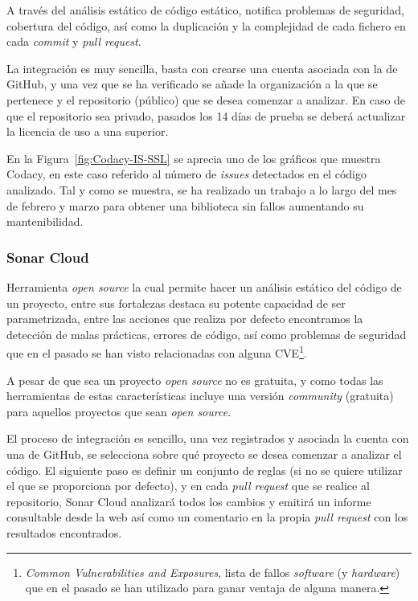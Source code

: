 A través del análisis estático de código estático, notifica problemas de seguridad, cobertura del código, así como la duplicación y la complejidad de cada fichero en cada \textit{commit} y \textit{pull request}.

La integración es muy sencilla, basta con crearse una cuenta asociada con la de GitHub, y una vez que se ha verificado se añade la organización a la que se pertenece y el repositorio (público) que se desea comenzar a analizar. En caso de que el repositorio sea privado, pasados los 14 días de prueba se deberá actualizar la licencia de uso a una superior.


En la Figura~\ref{fig:Codacy-IS-SSL} se aprecia uno de los gráficos que muestra Codacy, en este caso referido al número de \textit{issues} detectados en el código analizado. Tal y como se muestra, se ha realizado un trabajo a lo largo del mes de febrero y marzo para obtener una biblioteca sin fallos aumentando su mantenibilidad.

\subsubsection{Sonar Cloud}

Herramienta \textit{open source} la cual permite hacer un análisis estático del código de un proyecto, entre sus fortalezas destaca su potente capacidad de ser parametrizada, entre las acciones que realiza por defecto encontramos la detección de malas prácticas, errores de código, así como problemas de seguridad que en el pasado se han visto relacionadas con alguna CVE\footnote{\textit{Common Vulnerabilities and Exposures}, lista de fallos \textit{software} (y \textit{hardware}) que en el pasado se han utilizado para ganar ventaja de alguna manera.}.

A pesar de que sea un proyecto \textit{open source} no es gratuita, y como todas las herramientas de estas características incluye una versión \textit{community} (gratuita) para aquellos proyectos que sean \textit{open source}.

El proceso de integración es sencillo, una vez registrados y asociada la cuenta con una de GitHub, se selecciona sobre qué proyecto se desea comenzar a analizar el código. El siguiente paso es definir un conjunto de reglas (si no se quiere utilizar el que se proporciona por defecto), y en cada \textit{pull request} que se realice al repositorio, Sonar Cloud analizará todos los cambios y emitirá un informe consultable desde la web así como un comentario en la propia \textit{pull request} con los resultados encontrados.


